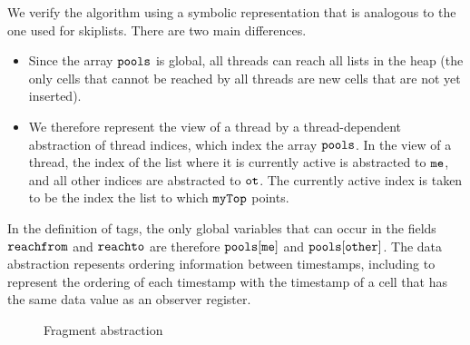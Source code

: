 We verify the algorithm using a symbolic representation that is analogous
to the one used for skiplists. There are two main differences.
\begin{itemize}
\item
  Since the array $\tt pools$ is global, all threads can reach all lists in
  the heap (the only cells that cannot be reached by all threads are
  new cells that are not yet inserted).
\item
  We therefore represent the view of a thread by a thread-dependent abstraction
  of thread indices, which index the array $\tt pools$. In the view of
  a thread, the index of the list where it is currently active
  is abstracted to $\tt me$, and all other
  indices are abstracted to $\tt ot$. The currently active index is taken to
  be the index the list to which $\tt myTop$ points.
\end{itemize}
In the definition of tags, the only global variables that can occur in
the fields $\mathtt{reachfrom}$ and $\mathtt{reachto}$ are therefore
$\tt pools[me]$ and $\tt pools[other]$. The data abstraction repesents
ordering information between timestamps, including to represent the ordering
of each timestamp with the timestamp of a cell that has the same data value
as an observer register.

\begin{figure}
\center
	
\caption{Fragment abstraction}
\label{fig:tsviewshape}
\end{figure} 

